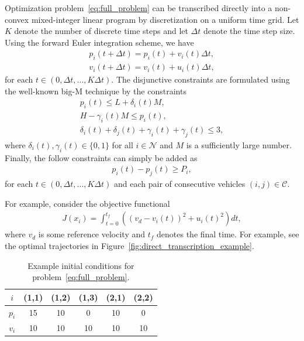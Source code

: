 \documentclass[a4paper]{article}
\theoremstyle{definition}
\theoremstyle{plain}
\begin{document}
Optimization problem~\eqref{eq:full_problem} can be transcribed directly into a
non-convex mixed-integer linear program by discretization on a uniform time
grid. Let $K$ denote the number of discrete time steps and let $\Delta t$ denote
the time step size.
%
Using the forward Euler integration scheme, we have
\begin{align*}
  p_{i}(t + \Delta t) = p_{i}(t) + v_{i}(t) \Delta t , \\
  v_{i}(t + \Delta t) = v_{i}(t) + u_{i}(t) \Delta t ,
\end{align*}
for each $t \in (0, \Delta t, \dots, K \Delta t)$. The disjunctive constraints are formulated
using the well-known big-M technique by the constraints
\begin{align*}
  p_{i}(t) \leq L + \delta_{i}(t) M , \\
  H - \gamma_{i}(t) M \leq p_{i}(t) , \\
  \delta_{i}(t) + \delta_{j}(t) + \gamma_{i}(t) + \gamma_{j}(t) \leq 3 ,
\end{align*}
where $\delta_{i}(t), \gamma_{i}(t) \in \{ 0, 1 \}$ for all $i \in \mathcal{N}$
and $M$ is a sufficiently large number.
%
Finally, the follow constraints can simply be added as
\begin{align*}
  p_{i}(t) - p_{j}(t) \geq P_{i} ,
\end{align*}
for each $t \in (0, \Delta t, \dots, K \Delta t)$ and each pair of consecutive
vehicles $(i, j) \in \mathcal{C}$.

For example, consider the objective functional
\begin{align*}
  J(x_{i}) = \int_{t=0}^{t_{f}} \left( {(v_{d} - v_{i}(t))}^{2} + {u_{i}(t)}^{2} \right) dt ,
\end{align*}
where $v_{d}$ is some reference velocity and $t_{f}$ denotes the final time. For
example, see the optimal trajectories in
Figure~\ref{fig:direct_transcription_example}.

\begin{table}[H]
  \centering
\begin{tabular}{ c | c c c | c c }
  $i$  & (1,1) & (1,2) & (1,3) & (2,1) & (2,2) \\
  \hline
  $p_{i}$ & 15 & 10 &  0 & 10 &  0 \\
  $v_{i}$ & 10 & 10 & 10 & 10 & 10 \\
\end{tabular}
\caption{Example initial conditions for problem~\eqref{eq:full_problem}.}
\label{tab:hult_parameters}
\end{table}
\end{document}
